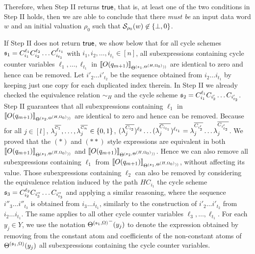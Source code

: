 Therefore, when Step II returns $\mathsf{true}$, that is, at least one of the two conditions in Step II holds, then we are able to conclude that there \emph{must be}  an input data word $w$ and an initial valuation $\rho_0$ such that $ {\mathcal{S} }_{\rho_0}(w) \not \in \{\bot, 0\}$. 

\smallskip

If Step II does not return $\mathsf{true}$, we show below that for all cycle schemes ${\mathfrak{s} }_1=C_{i_1}^{\ell_1} C_{i_2}^{\ell_2} \dots C_{i_{t_1}}^{\ell_{t_1}}$ with $i_1,i_2,\dots,i_{t_1} \in [n]$, all subexpressions containing cycle counter variables $\ell_1,\dots, \ell_{t_1}$ in $\llbracket O(q_{m+1})\rrbracket_{\Theta^{({\mathfrak{s} }_1, \Theta^{(H,\Omega_0)}))}}$ are identical to zero and hence can be removed. Let ${i'_2} \dots {i'_{t_2}}$ be the sequence obtained from $i_2 \dots i_{t_1}$ by keeping just one copy for each duplicated index therein.  
In Step II we already checked the equivalence relation $\sim_H$ and the cycle scheme ${\mathfrak{s} }_2=C_{i_1}^{\ell_1} C_{i'_2} \dots C_{i'_{t_2}}$. Step II guarantees that all subexpressions containing $\ell_1$ in 
$\llbracket O(q_{m+1})\rrbracket_{\Theta^{({\mathfrak{s} }_2, \Theta^{(H,\Omega_0)}))}}$ are identical to zero and hence can be removed.
Because for all $j\in[l]$, $\lambda^{^{\overline{C_1}}}_j, \dots, \lambda^{^{\overline{C_n}}}_j \in \{0,1\}$,   $(\lambda^{\overline{C_{i_2}}}_{j})^{\ell_2} \dots (\lambda^{\overline{C_{i_{t_1}}}}_{j})^{\ell_{t_1}} = \lambda^{\overline{C_{i'_2}}}_{j} \dots \lambda^{\overline{C_{i'_{t_2}}}}_{j}$. We proved that the $(\ast)$ and $(\ast\ast)$ style expressions are equivalent in both $\llbracket O(q_{m+1})\rrbracket_{\Theta^{({\mathfrak{s} }_1, \Theta^{(H,\Omega_0)}))}}$ and $\llbracket O(q_{m+1})\rrbracket_{\Theta^{({\mathfrak{s} }_2, \Theta^{(H,\Omega_0)}))}}$.
Hence we can also remove all subexpressions containing $\ell_1$ from  $\llbracket O(q_{m+1})\rrbracket_{\Theta^{({\mathfrak{s} }_1, \Theta^{(H,\Omega_0)}))}}$, without affecting its value.
Those subexpressions containing $\ell_2$ can also be removed by considering the equivalence relation induced by the path $HC_{i_1}$ the cycle scheme ${\mathfrak{s} }_3=C_{i_2}^{\ell_2} C_{i''_3} \dots C_{i''_{t_3}}$ and applying a similar reasoning, where the sequence ${i''_3} \dots {i''_{t_3}}$ is obtained from ${i_3} \dots  i_{t_1}$, similarly to the construction of ${i'_2} \dots {i'_{t_2}}$ from $i_2 \dots i_{t_1}$. The same applies to all other cycle counter variables $\ell_3,\dots,\ell_{t_1}$.
For each $y_j \in Y$, we use the notation ${\Theta^{({\mathfrak{s} }_1,\Omega)}}^-(y_j)$ to denote the expression obtained by removing from the constant atom and coefficients of the non-constant atoms of $\Theta^{({\mathfrak{s} }_1,\Omega)}(y_j)$ all subexpressions containing the cycle counter variables. 

